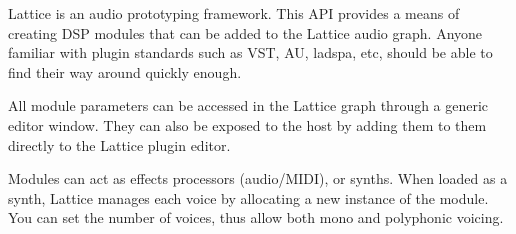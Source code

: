 Lattice is an audio prototyping framework. This API provides a means of creating DSP modules that can be added to the Lattice audio graph. Anyone familiar with plugin standards such as VST, AU, ladspa, etc, should be able to find their way around quickly enough.

All module parameters can be accessed in the Lattice graph through a generic editor window. They can also be exposed to the host by adding them to them directly to the Lattice plugin editor.

Modules can act as effects processors (audio/\+MIDI), or synths. When loaded as a synth, Lattice manages each voice by allocating a new instance of the module. You can set the number of voices, thus allow both mono and polyphonic voicing. 